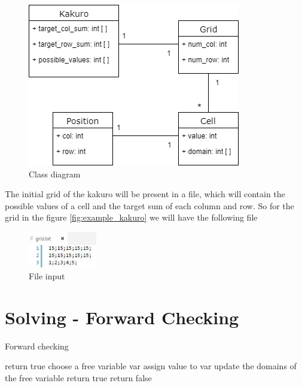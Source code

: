 \documentclass[journal, a4paper]{IEEEtran}
\begin{document}
\begin{figure}[h!]
    	 \begin{center}
		\includegraphics[width=\columnwidth]{class_diagram.png}
  		\caption{Class diagram}
		\label{fig:class_diagram}
    	 \end{center}
\end{figure}
The initial grid of the kakuro will be present in a file, which will contain the possible values of a cell and the target sum of each column and row. So for the grid in the figure \ref{fig:example_kakuro} we will have the following file\\
\begin{figure}[h!]
    	 \begin{center}
		\includegraphics[width=3cm]{file_input.JPG}
  		\caption{File input}
		\label{fig:file_input}
    	 \end{center}
\end{figure}

\section{Solving - Forward Checking}
\begin{algorithm}
	\caption{Forward checking}
	\label{forward_checking}
	\begin{algorithmic}[1]
			\State return true
		\EndIf
		\State choose a free variable var
			\State assign value to var
			\State update the domains of the free variable
					\State return true
				\EndIf
			\EndIf
		\EndFor
		\State return false
		\EndProcedure
	\end{algorithmic}
\end{algorithm}
\end{document}
